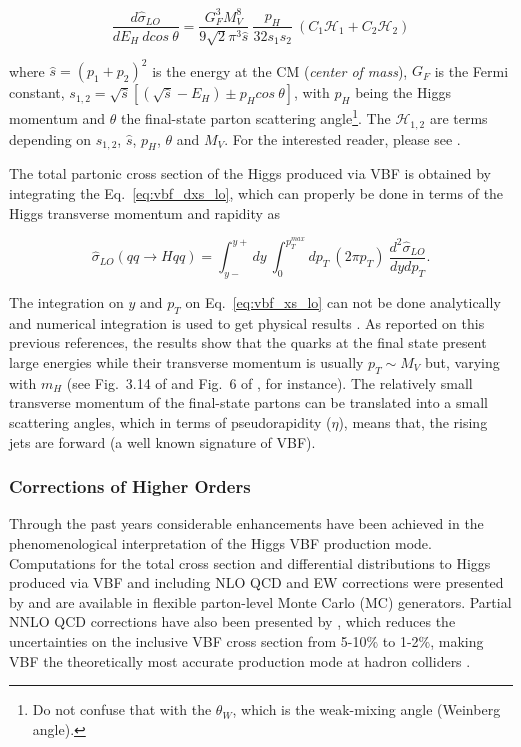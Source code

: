 \begin{equation}
\frac{d\hat{\sigma}_{LO}}{dE_{H}~dcos~\theta} = \frac{G_{F}^{3}M_{V}^{8}}{9\sqrt{2}\pi^{3}\hat{s}}~\frac{p_{H}}{32s_{1}s_{2}}~(C_{1}\mathcal{H}_{1} + C_{2}\mathcal{H}_{2})
\label{eq:vbf_dxs_lo}
\end{equation}

where $\hat{s} = (p_{1}+p_{2})^{2}$ is the energy at the CM (\textit{center of mass}), $G_{F}$ is the Fermi constant, $s_{1,2} = \sqrt{\hat{s}}[(\sqrt{\hat{s}}-E_{H}) \pm p_{H}cos~\theta]$, with $p_{H}$ being the Higgs momentum and $\theta$ the final-state parton scattering angle\footnote{Do not confuse that with the $\theta_{W}$, which is the weak-mixing angle (Weinberg angle).}. The $\mathcal{H}_{1,2}$ are terms depending on $s_{1,2}$, $\hat{s}$, $p_{H}$, $\theta$ and $M_{V}$. For the interested reader, please see \cite{bib:PhysRep457-1-2005}.

The total partonic cross section of the Higgs produced via VBF is obtained by integrating the Eq.~\ref{eq:vbf_dxs_lo}, which can properly be done in terms of the Higgs transverse momentum and rapidity as

\begin{equation}
\hat{\sigma}_{LO}(qq \rightarrow Hqq) = \int_{y-}^{y+}dy~\int_{0}^{p_{T}^{max}}dp_{T}~(2\pi p_{T})~\frac{d^{2}\hat{\sigma}_{LO}}{dydp_{T}}.
\label{eq:vbf_xs_lo}
\end{equation}

The integration on $y$ and $p_{T}$ on Eq.~\ref{eq:vbf_xs_lo} can not be done analytically and numerical integration is used to get physical results \cite{bib:PhysRep457-1-2005,bib:NuclPhysB287-1987}. As reported on this previous references, the results show that the quarks at the final state present large energies while their transverse momentum is usually $p_{T} \sim M_{V}$ but, varying with $m_{H}$ (see Fig.~3.14 of \cite{bib:PhysRep457-1-2005} and Fig.~6 of \cite{bib:NuclPhysB287-1987}, for instance). The relatively small transverse momentum of the final-state partons can be translated into a small scattering angles, which in terms of pseudorapidity ($\eta$), means that, the rising jets are forward (a well known signature of VBF).


\subsubsection{Corrections of Higher Orders}
Through the past years considerable enhancements have been achieved in the phenomenological interpretation of the Higgs VBF production mode. Computations for the total cross section and differential distributions to Higgs produced via VBF and including NLO QCD and EW corrections were presented by \cite{bib:Phys46-203-1998,bib:PhysRevLett69-3274-1992} and are available in flexible parton-level Monte Carlo (MC) generators. Partial NNLO QCD corrections have also been presented by \cite{bib:PhysRevD77-053010-2008,bib:PhysRevLett105-011801-2010}, which reduces the uncertainties on the inclusive VBF cross section from 5-10$\%$ to 1-2$\%$, making VBF the theoretically most accurate production mode at hadron colliders \cite{bib:ChinPhysC-38-9-2014}. 

